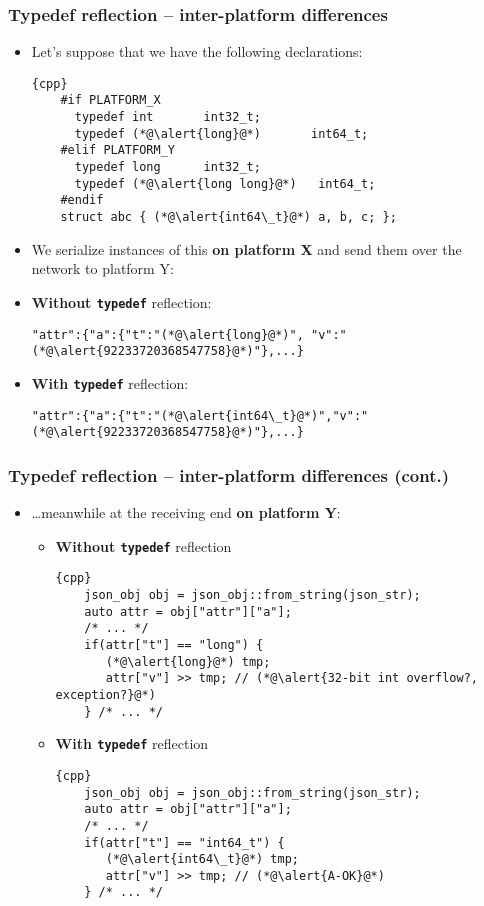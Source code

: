 \documentclass[compress,table,xcolor=table]{beamer}
\begin{document}
\begin{frame}[fragile]
\frametitle{Typedef reflection -- inter-platform differences}
  \small
  \begin{itemize}
    \item Let's suppose that we have the following declarations:
    \begin{lstlisting}{cpp}
	#if PLATFORM_X
	  typedef int       int32_t;
	  typedef (*@\alert{long}@*)       int64_t;
	#elif PLATFORM_Y
	  typedef long      int32_t;
	  typedef (*@\alert{long long}@*)   int64_t;
	#endif
	struct abc { (*@\alert{int64\_t}@*) a, b, c; };
    \end{lstlisting}
    \item We serialize instances of this \verb@struct@ \textbf{on platform X} and
      send them over the network to platform Y:
    \item \textbf{Without \texttt{typedef}} reflection:
    \begin{lstlisting}[basicstyle=\footnotesize\ttfamily]
	"attr":{"a":{"t":"(*@\alert{long}@*)", "v":"(*@\alert{92233720368547758}@*)"},...}
    \end{lstlisting}
    \item \textbf{With \texttt{typedef}} reflection:
    \begin{lstlisting}[basicstyle=\footnotesize\ttfamily]
	"attr":{"a":{"t":"(*@\alert{int64\_t}@*)","v":"(*@\alert{92233720368547758}@*)"},...}
    \end{lstlisting}
  \end{itemize}
\end{frame}

\begin{frame}[fragile]
\frametitle{Typedef reflection -- inter-platform differences (cont.)}
  \small
  \begin{itemize}
  \item \ldots meanwhile at the receiving end \textbf{on platform Y}:
    \begin{itemize}
    \item \textbf{Without \texttt{typedef}} reflection
      \begin{lstlisting}{cpp}
	json_obj obj = json_obj::from_string(json_str);
	auto attr = obj["attr"]["a"];
	/* ... */
	if(attr["t"] == "long") {
	   (*@\alert{long}@*) tmp;
	   attr["v"] >> tmp; // (*@\alert{32-bit int overflow?, exception?}@*)
	} /* ... */
      \end{lstlisting}
    \item \textbf{With \texttt{typedef}} reflection
      \begin{lstlisting}{cpp}
	json_obj obj = json_obj::from_string(json_str);
	auto attr = obj["attr"]["a"];
	/* ... */
	if(attr["t"] == "int64_t") {
	   (*@\alert{int64\_t}@*) tmp;
	   attr["v"] >> tmp; // (*@\alert{A-OK}@*)
	} /* ... */
      \end{lstlisting}
    \end{itemize}
  \end{itemize}
\end{frame}
\end{document}
